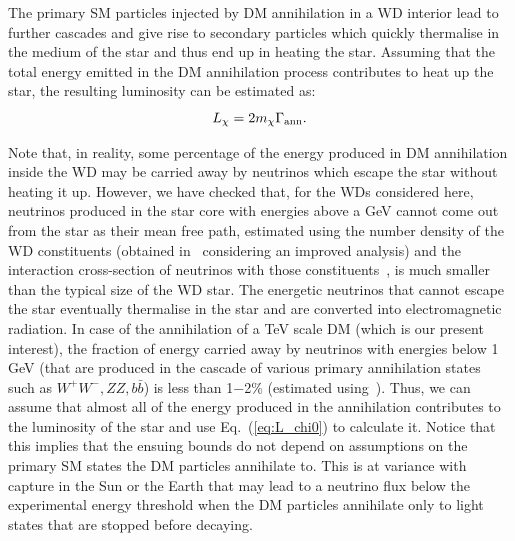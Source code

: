 \documentclass[11pt]{article}
\begin{document}
The primary SM particles injected by DM annihilation in a WD interior lead to further cascades and give rise to secondary particles which quickly thermalise in the medium of the star and thus end up in heating the star. Assuming that the total energy emitted in the DM annihilation process contributes to heat up the star, the resulting luminosity can be estimated as: 
\begin{equation}
L_{\chi} = 2 m_{\chi} \Gamma_{\rm ann} .
\label{eq:L_chi0}
\end{equation}

Note that, in reality, some percentage of the energy produced in DM annihilation inside the WD may be carried away by neutrinos which escape the star without heating it up. 
However, we have checked that, for the WDs considered here, 
neutrinos produced in the star core with energies above a GeV cannot come out from the star 
as their mean free path, estimated using the number density of the WD constituents 
(obtained in~\cite{improved_WD_2021} considering an improved analysis) 
and the interaction cross-section of neutrinos with those constituents~\cite{nu_cross-section_2012}, is much smaller than the typical size of the WD star. The energetic neutrinos that cannot escape the star eventually thermalise in the star and are converted into electromagnetic radiation.
In case of the annihilation of a TeV scale DM (which is our present interest), 
the fraction of energy carried away by neutrinos with energies below 1 GeV (that are produced in the cascade of various primary annihilation states such as $W^+W^-, ZZ, b\bar{b}$) 
is less than 1$-$2\% (estimated using~\cite{Cirelli_PPPC}).
Thus, we can assume that almost all of the energy produced in the annihilation contributes to the luminosity of the star and use Eq.~(\ref{eq:L_chi0}) to calculate it. Notice that this implies that the ensuing bounds do not depend on assumptions on the primary SM states the DM particles annihilate to. This is at variance with capture in the Sun or the Earth that may lead to a neutrino flux below the experimental energy threshold when the DM particles annihilate only to light states that are stopped before decaying.
\end{document}
